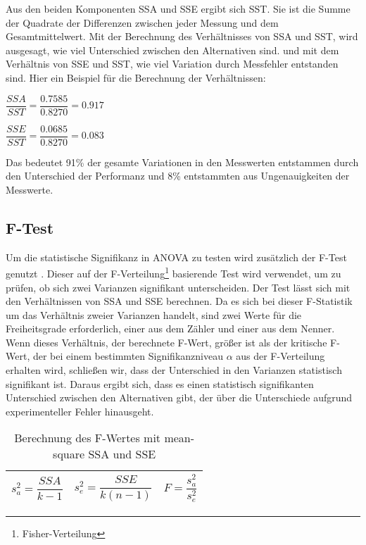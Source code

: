 Aus den beiden Komponenten SSA und SSE ergibt sich SST.
Sie ist die Summe der Quadrate der Differenzen zwischen jeder Messung und dem Gesamtmittelwert.
Mit der Berechnung des Verhältnisses von SSA und SST, wird ausgesagt, wie viel Unterschied zwischen den Alternativen sind.
und mit dem Verhältnis von SSE und SST, wie viel Variation durch Messfehler entstanden sind.  
Hier ein Beispiel für die Berechnung der Verhältnissen:

\begin{center}
  $\dfrac{SSA}{SST} = \dfrac{0.7585}{0.8270} = 0.917$
\end{center}

\begin{center}
  $\dfrac{SSE}{SST} = \dfrac{0.0685}{0.8270} = 0.083$
\end{center}

Das bedeutet 91\% der gesamte Variationen in den Messwerten entstammen durch den Unterschied der Performanz und
8\% entstammten aus Ungenauigkeiten der Messwerte. 



\subsection{F-Test}
Um die statistische Signifikanz in ANOVA zu testen wird zusätzlich der F-Test genutzt \cite{Lilja_2000}.
Dieser auf der F-Verteilung\footnote{Fisher-Verteilung} basierende Test wird verwendet, um zu prüfen, ob sich zwei Varianzen signifikant unterscheiden.
Der Test lässt sich mit den Verhältnissen von SSA und SSE berechnen.
Da es sich bei dieser F-Statistik um das Verhältnis zweier Varianzen handelt, sind zwei Werte für die Freiheitsgrade erforderlich, 
einer aus dem Zähler und einer aus dem Nenner.
Wenn dieses Verhältnis, der berechnete F-Wert, größer ist als der kritische F-Wert, der bei einem bestimmten Signifikanzniveau $\alpha$ aus der F-Verteilung erhalten wird, 
schließen wir, dass der Unterschied in den Varianzen statistisch signifikant ist. Daraus ergibt sich, 
dass es einen statistisch signifikanten Unterschied zwischen den Alternativen gibt, der über die Unterschiede aufgrund experimenteller Fehler hinausgeht.

\begin{center}
  \begin{table}[h!]
    \begin{tabularx}{\textwidth}{|X|X|X|}
      \hline
       $s^2_a = \dfrac{SSA}{k - 1}$ & $s^2_e = \dfrac{SSE}{k(n-1)}$ & $F = \dfrac{s^2_a}{s^2_e}$\\ 
      \hline
    \end{tabularx}
    \caption{Berechnung des F-Wertes mit mean-square SSA und SSE}
    \label{tab:f_computing}
  \end{table}
\end{center}

